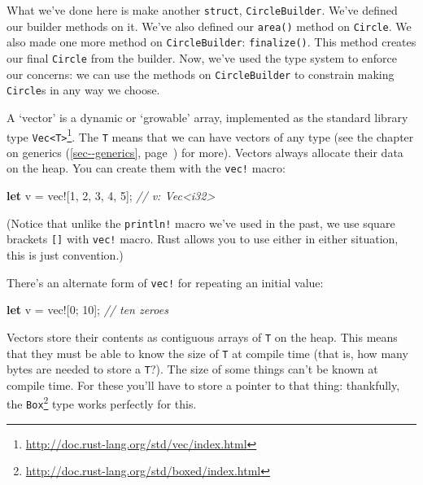 \documentclass[a4paper,]{book}
\renewcommand*{\hyperref}[2][\ar]{%
  \def\ar{#2}%
  #2 (\autoref{#1}, page~\pageref{#1})}
\newenvironment{Shaded}{\begin{snugshade}}{\end{snugshade}}
\newcommand{\KeywordTok}[1]{\textcolor[rgb]{0.13,0.29,0.53}{\textbf{{#1}}}}
\newcommand{\DecValTok}[1]{\textcolor[rgb]{0.00,0.00,0.81}{{#1}}}
\newcommand{\CommentTok}[1]{\textcolor[rgb]{0.56,0.35,0.01}{\textit{{#1}}}}
\newcommand{\OtherTok}[1]{\textcolor[rgb]{0.56,0.35,0.01}{{#1}}}
\newcommand{\NormalTok}[1]{{#1}}
\renewcommand{\href}[2]{#2\footnote{\url{#1}}}
\begin{document}
What we've done here is make another \texttt{struct},
\texttt{CircleBuilder}. We've defined our builder methods on it. We've
also defined our \texttt{area()} method on \texttt{Circle}. We also made
one more method on \texttt{CircleBuilder}: \texttt{finalize()}. This
method creates our final \texttt{Circle} from the builder. Now, we've
used the type system to enforce our concerns: we can use the methods on
\texttt{CircleBuilder} to constrain making \texttt{Circle}s in any way
we choose.


A `vector' is a dynamic or `growable' array, implemented as the standard
library type
\href{http://doc.rust-lang.org/std/vec/index.html}{\texttt{Vec\textless{}T\textgreater{}}}.
The \texttt{T} means that we can have vectors of any type (see the
chapter on \hyperref[sec--generics]{generics} for more). Vectors always
allocate their data on the heap. You can create them with the
\texttt{vec!} macro:

\begin{Shaded}
\begin{Highlighting}[]
\KeywordTok{let} \NormalTok{v = }\OtherTok{vec!}\NormalTok{[}\DecValTok{1}\NormalTok{, }\DecValTok{2}\NormalTok{, }\DecValTok{3}\NormalTok{, }\DecValTok{4}\NormalTok{, }\DecValTok{5}\NormalTok{]; }\CommentTok{// v: Vec<i32>}
\end{Highlighting}
\end{Shaded}

(Notice that unlike the \texttt{println!} macro we've used in the past,
we use square brackets \texttt{{[}{]}} with \texttt{vec!} macro. Rust
allows you to use either in either situation, this is just convention.)

There's an alternate form of \texttt{vec!} for repeating an initial
value:

\begin{Shaded}
\begin{Highlighting}[]
\KeywordTok{let} \NormalTok{v = }\OtherTok{vec!}\NormalTok{[}\DecValTok{0}\NormalTok{; }\DecValTok{10}\NormalTok{]; }\CommentTok{// ten zeroes}
\end{Highlighting}
\end{Shaded}

Vectors store their contents as contiguous arrays of \texttt{T} on the
heap. This means that they must be able to know the size of \texttt{T}
at compile time (that is, how many bytes are needed to store a
\texttt{T}?). The size of some things can't be known at compile time.
For these you'll have to store a pointer to that thing: thankfully, the
\href{http://doc.rust-lang.org/std/boxed/index.html}{\texttt{Box}} type
works perfectly for this.
\end{document}
